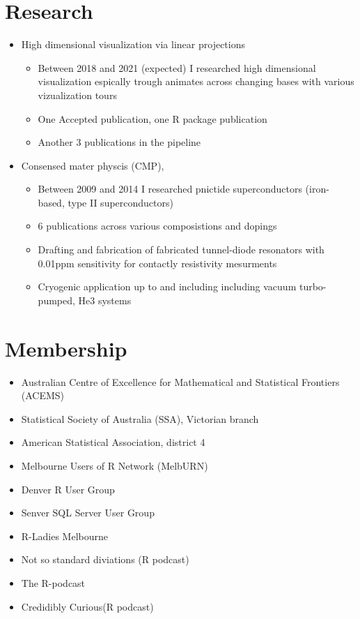 \documentclass[10pt,a4paper,]{article}
\providecommand{\tightlist}{%
  \setlength{\itemsep}{0pt}\setlength{\parskip}{0pt}}
\begin{document}
\hypertarget{research}{%
\section{Research}\label{research}}

\begin{itemize}
\tightlist
\item
  High dimensional visualization via linear projections

  \begin{itemize}
  \tightlist
  \item
    Between 2018 and 2021 (expected) I researched high dimensional visualization espically trough animates across changing bases with various vizualization tours
  \item
    One Accepted publication, one R package publication
  \item
    Another 3 publications in the pipeline
  \end{itemize}
\item
  Consensed mater physcis (CMP),

  \begin{itemize}
  \tightlist
  \item
    Between 2009 and 2014 I researched pnictide superconductors (iron-based, type II superconductors)
  \item
    6 publications across various composistions and dopings
  \item
    Drafting and fabrication of fabricated tunnel-diode resonators with 0.01ppm sensitivity for contactly resistivity mesurments
  \item
    Cryogenic application up to and including including vacuum turbo-pumped, He3 systems
  \end{itemize}
\end{itemize}

\hypertarget{membership}{%
\section{Membership}\label{membership}}

\begin{itemize}
\tightlist
\item
  Australian Centre of Excellence for Mathematical and Statistical Frontiers (ACEMS)
\item
  Statistical Society of Australia (SSA), Victorian branch
\item
  American Statistical Association, district 4
\item
  Melbourne Users of R Network (MelbURN)
\item
  Denver R User Group
\item
  Senver SQL Server User Group
\item
  R-Ladies Melbourne
\item
  Not so standard diviations (R podcast)
\item
  The R-podcast
\item
  Credidibly Curious(R podcast)
\end{itemize}
\end{document}
